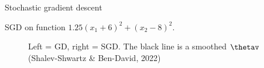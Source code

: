 \begin{vbframe}{Stochastic gradient descent}
  \framebreak

 
 SGD on function $1.25(x_1 + 6)^2 + (x_2 - 8)^2$.
 \begin{figure}
 \begin{center}
 \caption{Left = GD, right = SGD. The black line is a smoothed $\thetav$ (Shalev-Shwartz \& Ben-David, 2022)}
 \end{center}
 \end{figure}

  \end{vbframe}
  


